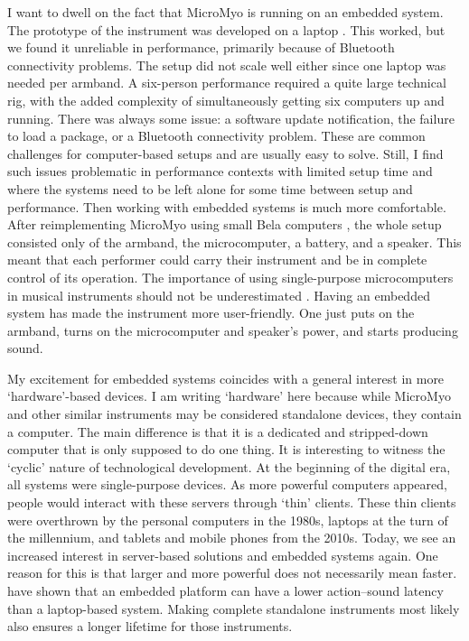 I want to dwell on the fact that MicroMyo is running on an embedded system. The prototype of the instrument was developed on a laptop \citep{jensenius_Exploring_2017a}. This worked, but we found it unreliable in performance, primarily because of Bluetooth connectivity problems. The setup did not scale well either since one laptop was needed per armband. A six-person performance required a quite large technical rig, with the added complexity of simultaneously getting six computers up and running. There was always some issue: a software update notification, the failure to load a package, or a Bluetooth connectivity problem. These are common challenges for computer-based setups and are usually easy to solve. Still, I find such issues problematic in performance contexts with limited setup time and where the systems need to be left alone for some time between setup and performance.
Then working with embedded systems is much more comfortable. After reimplementing MicroMyo using small Bela computers \citep{martin_composing_2018}, the whole setup consisted only of the armband, the microcomputer, a battery, and a speaker. This meant that each performer could carry their instrument and be in complete control of its operation. The importance of using single-purpose microcomputers in musical instruments should not be underestimated \citep{berdahl_satellite_2011}. Having an embedded system has made the instrument more user-friendly. One just puts on the armband, turns on the microcomputer and speaker's power, and starts producing sound.

My excitement for embedded systems coincides with a general interest in more `hardware'-based devices. I am writing `hardware' here because while MicroMyo and other similar instruments may be considered standalone devices, they contain a computer. The main difference is that it is a dedicated and stripped-down computer that is only supposed to do one thing. It is interesting to witness the `cyclic' nature of technological development. At the beginning of the digital era, all systems were single-purpose devices. As more powerful computers appeared, people would interact with these servers through `thin' clients. These thin clients were overthrown by the personal computers in the 1980s, laptops at the turn of the millennium, and tablets and mobile phones from the 2010s. Today, we see an increased interest in server-based solutions and embedded systems again. One reason for this is that larger and more powerful does not necessarily mean faster. \citet{mcpherson_action-sound_2016} have shown that an embedded platform can have a lower action--sound latency than a laptop-based system. Making complete standalone instruments most likely also ensures a longer lifetime for those instruments.


